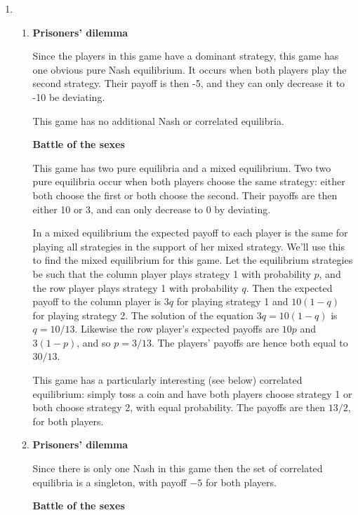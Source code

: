 \documentclass[11pt]{article} \usepackage{amssymb}
\begin{document}
\begin{enumerate}
\begin{enumerate}
  \item
    \begin{enumerate}
    \item {\bf Prisoners' dilemma}

      Since the players in this game have a dominant strategy, this
      game has one obvious pure Nash equilibrium. It occurs when both
      players play the second strategy. Their payoff is then -5, and
      they can only decrease it to -10 be deviating.

      This game has no additional Nash or correlated equilibria.
      
      \vspace{0.1in}
      {\bf Battle of the sexes}

      This game has two pure equilibria and a mixed equilibrium. Two
      two pure equilibria occur when both players choose the same
      strategy: either both choose the first or both choose the
      second. Their payoffs are then either 10 or 3, and can only
      decrease to 0 by deviating.

      In a mixed equilibrium the expected payoff to each player is the
      same for playing all strategies in the support of her mixed
      strategy. We'll use this to find the mixed equilibrium for this
      game. Let the equilibrium strategies be such that the column
      player plays strategy 1 with probability $p$, and the row
      player plays strategy 1 with probability $q$. Then the expected
      payoff to the column player is $3q$ for playing strategy 1 and
      $10(1-q)$ for playing strategy 2. The solution of the equation
      $3q=10(1-q)$ is $q=10/13$. Likewise the row player's expected
      payoffs are $10p$ and $3(1-p)$, and so $p=3/13$. The players'
      payoffs are hence both equal to $30/13$.

      This game has a particularly interesting (see below) correlated
      equilibrium: simply toss a coin and have both players choose
      strategy 1 or both choose strategy 2, with equal
      probability. The payoffs are then $13/2$, for both players.

    \item {\bf Prisoners' dilemma}

      Since there is only one Nash in this game then the set of
      correlated equilibria is a singleton, with payoff $-5$ for both
      players.
      
      \vspace{0.1in}
      {\bf Battle of the sexes}


\end{enumerate}
\end{enumerate}
\end{enumerate}
\end{document}
